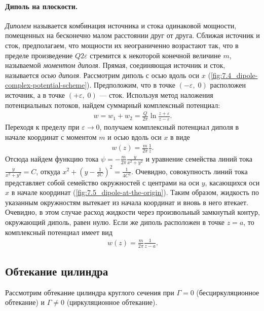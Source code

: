 	\paragraph{Диполь на плоскости.} \textit{Диполем} называется комбинация источника и стока одинаковой мощности, помещенных на бесконечно малом расстоянии друг от друга. Сближая источник и сток, предполагаем, что мощности их неограниченно возрастают так, что в пределе произведение $Q2\varepsilon$ стремится к некоторой конечной величине $m$, называемой \textit{моментом диполя}. Прямая, соединяющая источник и сток, называется \textit{осью диполя}.\n
	Рассмотрим диполь с осью вдоль оси $x$ (\cref{fig:7.4_dipole-complex-potential-scheme}). Предположим, что в точке $\left(-\varepsilon,\; 0\right)$ расположен источник, а в точке $\left(+\varepsilon,\; 0\right)$ --- сток. Используя метод наложения потенциальных потоков, найдем суммарный комплексный потенциал:
	\begin{gather*}
		w = w_1 + w_2 = \frac{Q}{2\pi}\ln\frac{z + \varepsilon}{z - \varepsilon}.
	\end{gather*}\n
	Переходя к пределу при $\varepsilon\rightarrow 0$, получаем комплексный потенциал диполя в начале координат с моментом $m$ и осью вдоль оси $x$ в виде
	\begin{gather}
		w\left(z\right) = \frac{m}{2\pi}\frac{1}{z}.\label{eq:721}
	\end{gather}\n
	Отсюда найдем функцию тока $\psi = -\frac{m}{2\pi}\frac{y}{x^2 + y^2}$ и уравнение семейства линий тока $\frac{y}{x^2 + y^2} = C$, откуда $x^2 + \left(y - \frac{1}{2C}\right)^2 = \frac{1}{4C^2}$.\n
	Очевидно, совокупность линий тока представляет собой семейство окружностей с центрами на оси $y$, касающихся оси $x$ в начале координат (\cref{fig:7.5_dipole-at-the-origin}). Таким образом, жидкость по указанным окружностям вытекает из начала координат и вновь в него втекает. Очевидно, в этом случае расход жидкости через произвольный замкнутый контур, окружающий диполь, равен нулю. Если же диполь расположен в точке $z = a$, то комплексный потенциал имеет вид
	\begin{gather}
		w\left(z\right) = \frac{m}{2\pi}\frac{1}{z - a}.\label{eq:722}
	\end{gather}
	
	\subsection{Обтекание цилиндра}\label{sec:7.2}
	Рассмотрим обтекание цилиндра круглого сечения при $\Gamma = 0$ (бесциркуляционное обтекание) и $\Gamma\ne 0$ (циркуляционное обтекание).
	
